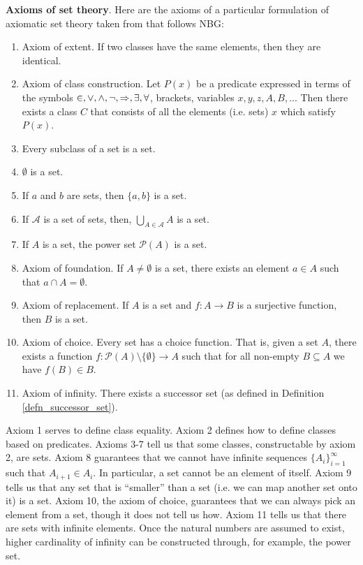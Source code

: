\documentclass{bareminimum}
\begin{document}
\textbf{Axioms of set theory}. Here  are the axioms of a particular formulation of axiomatic set theory taken from \cite{pinter2014book} that follows NBG:
\begin{enumerate}
	\item Axiom of extent. If two classes have the same elements, then they are identical.
	\item Axiom of class construction. Let $P(x)$ be a predicate expressed in terms of the symbols $\in, \vee, \wedge, \neg, \Rightarrow, \exists, \forall$, brackets, variables $x, y, z, A, B, ...$ Then there exists a class $C$ that consists of all the elements (i.e. sets) $x$ which satisfy $P(x)$.
	\item Every subclass of a set is a set.
	\item $\emptyset$ is a set.
	\item If $a$ and $b$ are sets, then $\{a, b\}$ is a set.
	\item If $\mathcal{A}$ is a set of sets, then, $\bigcup\limits_{A \in \mathcal{A}} A$ is a set.
	\item If $A$ is a set, the power set $\mathcal{P}(A)$ is a set.
	\item Axiom of foundation. If $A \neq \emptyset$ is a set, there exists an element $a \in A$ such that $a \cap A = \emptyset$.
	\item Axiom of replacement. If $A$ is a set and $f : A \to B$ is a surjective function, then $B$ is a set.
	\item Axiom of choice. Every set has a choice function. That is, given a set $A$, there exists a function $f : \mathcal{P}(A) \setminus \{ \emptyset \} \to A$ such that for all non-empty $B \subseteq A$ we have $f(B) \in B$.
	\item Axiom of infinity. There exists a successor set (as defined in Definition \ref{defn_successor_set}).
\end{enumerate}


\begin{remark}
	Axiom 1 serves to define class equality. Axiom 2 defines how to define classes based on predicates. Axioms 3-7 tell us that some classes, constructable by axiom 2, are sets. Axiom 8 guarantees that we cannot have infinite sequences $\{ A_i \}_{i=1}^\infty$ such that $A_{i+1} \in A_i$. In particular, a set cannot be an element of itself. Axiom 9 tells us that any set that is ``smaller'' than a set (i.e. we can map another set onto it) is a set. Axiom 10, the axiom of choice, guarantees that we can always pick an element from a set, though it does not tell us how. Axiom 11 tells us that there are sets with infinite elements. Once the natural numbers are assumed to exist, higher cardinality of infinity can be constructed through, for example, the power set.
\end{remark}
\end{document}
